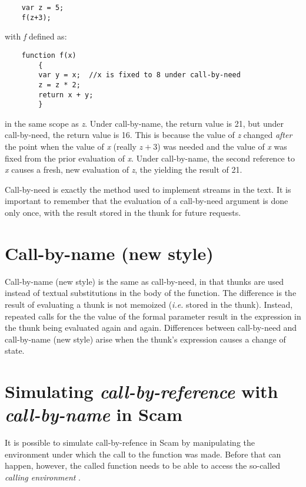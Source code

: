 \begin{verbatim}
    var z = 5;
    f(z+3); 
\end{verbatim}

with {\it f} defined as:

\begin{verbatim}
    function f(x)
        {
        var y = x;  //x is fixed to 8 under call-by-need
        z = z * 2;
        return x + y;
        }
\end{verbatim}

in the same scope as {\it z}.
Under call-by-name, the return value is 21, but under
call-by-need, the return value is 16.
This is because the
value of {\it z} changed {\it after} the point when the value of {\it x}
(really $z+3$) was needed and the value of {\it x} was fixed from
the prior evaluation of {\it x}. Under call-by-name, the second
reference to {\it x} causes a fresh, new evaluation of {\it z},
the yielding the result of 21.

Call-by-need
is exactly the method used to implement streams in the text.
It is important to remember that the evaluation of a
call-by-need argument is done only once, 
with the result stored in the thunk for future requests.

\section*{Call-by-name (new style)}

Call-by-name (new style) is the same as call-by-need, in
that thunks are used instead of textual substitutions
in the body of the function. The difference is the
result of evaluating a thunk is not memoized ({\it i.e.} stored
in the thunk). Instead, repeated
calls for the the value of the formal parameter result in the
expression in the thunk being evaluated again and again.
Differences between call-by-need and call-by-name (new style) 
arise when the thunk's expression causes a change of state.

\section*{Simulating {\it call-by-reference} with {\it call-by-name} in Scam}

It is possible to simulate call-by-refence in Scam by manipulating
the environment under which the call to the function was made.
Before that can happen, however, the called function needs to
be able to access the so-called {\it calling environment} .

